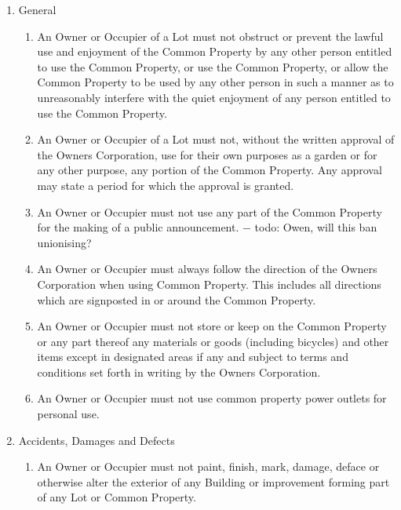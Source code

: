 \documentclass{article}
\begin{document}
\begin{enumerate}[label=\arabic*.]
\begin{enumerate}[label=\arabic{enumi}.\arabic*.]

\item  General

\begin{enumerate}[label=(\arabic*)]

\item  An Owner or Occupier of a Lot must not obstruct or prevent the lawful use and enjoyment of the Common Property by any other person entitled to use the Common Property, or use the Common Property, or allow the Common Property to be used by any other person in such a manner as to unreasonably interfere with the quiet enjoyment of any person entitled to use the Common Property.

\item  An Owner or Occupier of a Lot must not, without the written approval of the Owners Corporation, use for their own purposes as a garden or for any other purpose, any portion of the Common Property. Any approval may state a period for which the approval is granted.

\item  An Owner or Occupier must not use any part of the Common Property for the making of a public announcement. − todo: Owen, will this ban unionising?

\item  An Owner or Occupier must always follow the direction of the Owners Corporation when using Common Property. This includes all directions which are signposted in or around the Common Property.

\item  An Owner or Occupier must not store or keep on the Common Property or any part thereof any materials or goods (including bicycles) and other items except in designated areas if any and subject to terms and conditions set forth in writing by the Owners Corporation.

\item  An Owner or Occupier must not use common property power outlets for personal use.

\end{enumerate}

\item  Accidents, Damages and Defects

\begin{enumerate}[label=(\arabic*)]

\item  An Owner or Occupier must not paint, finish, mark, damage, deface or otherwise alter the exterior of any Building or improvement forming part of any Lot or Common Property.


\end{enumerate}
\end{enumerate}
\end{enumerate}
\end{document}
